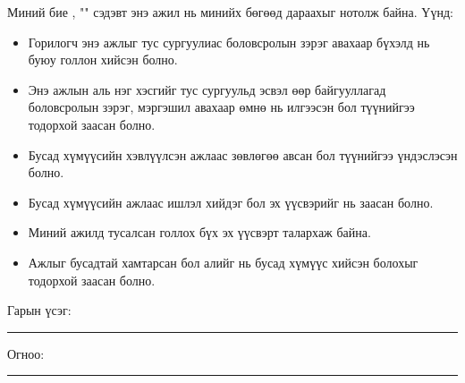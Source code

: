\begin{declaration}
\addchaptertocentry{\authorshipname}

\noindent Миний бие \shortname, "{\ttitle}" сэдэвт энэ ажил нь минийх бөгөөд дараахыг нотолж байна. Үүнд:

\begin{itemize} 
\item Горилогч энэ ажлыг тус сургуулиас боловсролын зэрэг авахаар бүхэлд нь буюу голлон хийсэн болно.
\item Энэ ажлын аль нэг хэсгийг тус сургуульд эсвэл өөр байгууллагад боловсролын зэрэг, мэргэшил авахаар өмнө нь илгээсэн бол түүнийгээ тодорхой заасан болно.
\item Бусад хүмүүсийн хэвлүүлсэн ажлаас зөвлөгөө авсан бол түүнийгээ үндэслэсэн болно.
\item Бусад хүмүүсийн ажлаас ишлэл хийдэг бол эх үүсвэрийг нь заасан болно.
\item Миний ажилд тусалсан голлох бүх эх үүсвэрт талархаж байна.
\item Ажлыг бусадтай хамтарсан бол алийг нь бусад хүмүүс хийсэн болохыг тодорхой заасан болно.
\end{itemize}
\bigskip
 
\noindent Гарын үсэг: \rule[-0.5em]{12.7em}{0.5pt}
\bigskip

\noindent Огноо: \rule[-0.5em]{15em}{0.5pt}

\end{declaration}

\clearpage

